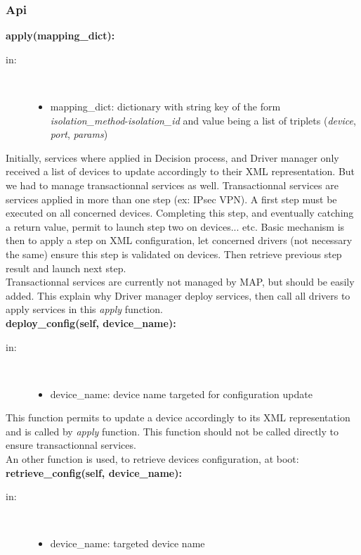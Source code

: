 \subsubsection{Api}
\textbf{apply(mapping\_dict):}
\begin{description}
    \item[in:] \hfill \\
        \begin{itemize}
            \item mapping\_dict: dictionary with string key of the form \emph{isolation\_method}-\emph{isolation\_id} and value being a list of triplets (\emph{device}, \emph{port}, \emph{params})
        \end{itemize}
\end{description}
Initially, services where applied in Decision process, and Driver manager only received a list of devices to update accordingly to their XML representation. But we had to manage transactionnal services as well. Transactionnal services are services applied in more than one step (ex: IPsec VPN). A first step must be executed on all concerned devices. Completing this step, and eventually catching a return value, permit to launch step two on devices... etc. Basic mechanism is then to apply a step on XML configuration, let concerned drivers (not necessary the same) ensure this step is validated on devices. Then retrieve previous step result and launch next step.\\
Transactionnal services are currently not managed by MAP, but should be easily added. This explain why Driver manager deploy services, then call all drivers to apply services in this \emph{apply} function.\\[1\baselineskip]
\textbf{deploy\_config(self, device\_name):}
\begin{description}
    \item[in:] \hfill \\
        \begin{itemize}
            \item device\_name: device name targeted for configuration update
        \end{itemize}
\end{description}
This function permits to update a device accordingly to its XML representation and is called by \emph{apply} function. This function should not be called directly to ensure transactionnal services.\\
An other function is used, to retrieve devices configuration, at boot:\\[1\baselineskip]
\textbf{retrieve\_config(self, device\_name):}
\begin{description}
    \item[in:] \hfill \\
        \begin{itemize}
            \item device\_name: targeted device name
        \end{itemize}
\end{description}

